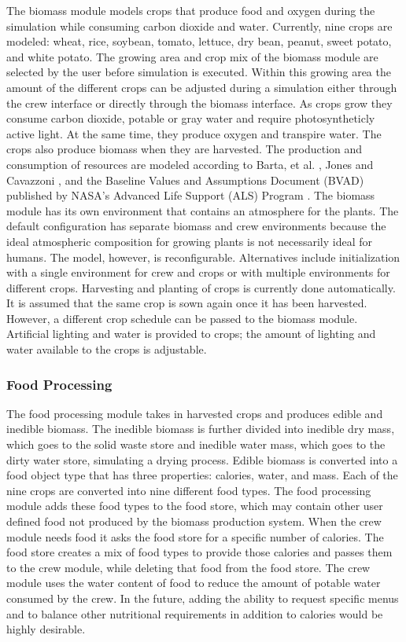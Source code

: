 \documentclass[submit]{aiaa}
\begin{document}
The biomass module models crops that produce food and oxygen during the
simulation while consuming carbon dioxide and water.  
Currently, nine crops are modeled: wheat, rice,
soybean, tomato, lettuce, dry bean, peanut, sweet potato, and white
potato.  The growing area and crop mix of the biomass module are
selected by the user before simulation is executed.  
Within this growing area the amount of the
different crops can be adjusted during a simulation either through
the crew interface or directly through the biomass interface.  As
crops grow they consume carbon dioxide, potable or gray water and
require photosyntheticly active light.
At the same time, they produce oxygen and transpire water.  The crops also produce biomass when they are harvested.
The production and consumption of resources are modeled according to
Barta, et al. \cite{barta_etal99}, Jones and Cavazzoni
\cite{jones_cavazzoni00}, and the Baseline Values and Assumptions
Document (BVAD) published by NASA's Advanced Life Support (ALS) Program
\cite{bvad04}.  The biomass module has its own environment that
contains an atmosphere for the plants.  The default configuration has
separate biomass and crew environments because the ideal atmospheric 
composition for growing plants is not necessarily  ideal for humans.  
The model, however,  is reconfigurable. 
Alternatives include initialization with a single environment for crew
and crops or with multiple environments for different crops.  
Harvesting and planting of crops is currently done automatically.
It is assumed that the same crop is sown again once it has been harvested.  
However, a different crop schedule can be passed to the biomass module.
Artificial lighting and water is provided to crops; the amount
of  lighting and water available to the crops is adjustable.

\subsubsection{Food Processing}

The food processing module takes in harvested crops and produces
edible and inedible biomass.  The inedible biomass is further divided into
inedible dry mass, which goes to the solid waste store and inedible
water mass, which goes to the dirty water store, simulating a drying process.
Edible biomass is
converted into a food object type that has three properties: calories,
water, and mass.  Each of the nine crops are converted into nine
different food types.  The food processing module adds these food
types to the food store, which may contain other user defined food not
produced by the biomass production system.  When the crew module needs
food it asks the food store for a specific number of calories.  The
food store creates a mix of food types to provide those calories and
passes them to the crew module, while deleting that food from the food
store.  The crew module uses the water content of food to reduce the
amount of potable water consumed by the crew.  In the future,
adding the ability to request specific menus and to balance other
nutritional requirements in addition to calories would be highly desirable.
\end{document}
